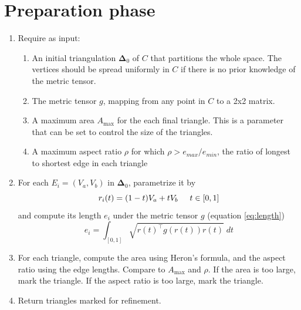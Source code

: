 \section{Preparation phase}
\begin{enumerate}
    \item Require as input:
    \begin{enumerate}
        \item An initial triangulation $\mathbf{\Delta}_0$ of $C$ that partitions the whole space. The vertices should be spread uniformly in $C$ if there is no prior knowledge of the metric tensor.
        \item The metric tensor $g$, mapping from any point in $C$ to a 2x2 matrix.
        \item A maximum area $A_{\text{max}}$ for the each final triangle. This is a parameter that can be set to control the size of the triangles.
        \item A maximum aspect ratio $\rho$ for which $\rho > e_{max}/e_{min}$, the ratio of longest to shortest edge in each triangle
    \end{enumerate}
    \item For each $E_i = (V_a, V_b)$ in $\mathbf{\Delta}_0$, parametrize it by 
    $$r_i(t) = (1-t)V_a + tV_b \hspace{5mm} t\in[0,1]$$
     and compute its length $e_i$ under the metric tensor $g$ (equation \ref{eq:length}) 
    $$e_i = \int_{[0,1]} \sqrt{
        r(t)^\top g(r(t)) r(t) } \; dt
    $$
    \item For each triangle, compute the area using Heron's formula, and the aspect ratio using the edge lengths. Compare to $A_{\text{max}}$ and $\rho$. If the area is too large, mark the triangle. If the aspect ratio is too large, mark the triangle.
    \item Return triangles marked for refinement.
\end{enumerate}
